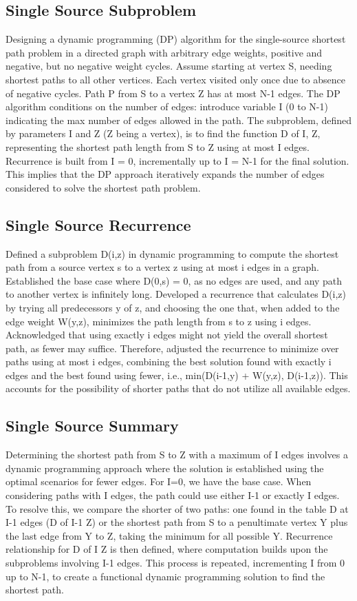 \subsection*{Single Source  Subproblem}
Designing a dynamic programming (DP) algorithm for the single-source shortest path problem in a directed graph with arbitrary edge weights, positive and negative, but no negative weight cycles.
Assume starting at vertex S, needing shortest paths to all other vertices.
Each vertex visited only once due to absence of negative cycles.
Path P from S to a vertex Z has at most N-1 edges.
The DP algorithm conditions on the number of edges: introduce variable I (0 to N-1) indicating the max number of edges allowed in the path.
The subproblem, defined by parameters I and Z (Z being a vertex), is to find the function D of I, Z, representing the shortest path length from S to Z using at most I edges.
Recurrence is built from I = 0, incrementally up to I = N-1 for the final solution.
This implies that the DP approach iteratively expands the number of edges considered to solve the shortest path problem.

\subsection*{Single Source  Recurrence}
Defined a subproblem D(i,z) in dynamic programming to compute the shortest path from a source vertex s to a vertex z using at most i edges in a graph.
Established the base case where D(0,s) = 0, as no edges are used, and any path to another vertex is infinitely long.
Developed a recurrence that calculates D(i,z) by trying all predecessors y of z, and choosing the one that, when added to the edge weight W(y,z), minimizes the path length from s to z using i edges.
Acknowledged that using exactly i edges might not yield the overall shortest path, as fewer may suffice.
Therefore, adjusted the recurrence to minimize over paths using at most i edges, combining the best solution found with exactly i edges and the best found using fewer, i.e., min(D(i-1,y) + W(y,z), D(i-1,z)).
This accounts for the possibility of shorter paths that do not utilize all available edges.

\subsection*{Single Source  Summary}
Determining the shortest path from S to Z with a maximum of I edges involves a dynamic programming approach where the solution is established using the optimal scenarios for fewer edges.
For I=0, we have the base case.
When considering paths with I edges, the path could use either I-1 or exactly I edges.
To resolve this, we compare the shorter of two paths: one found in the table D at I-1 edges (D of I-1 Z) or the shortest path from S to a penultimate vertex Y plus the last edge from Y to Z, taking the minimum for all possible Y\@.
Recurrence relationship for D of I Z is then defined, where computation builds upon the subproblems involving I-1 edges.
This process is repeated, incrementing I from 0 up to N-1, to create a functional dynamic programming solution to find the shortest path.

